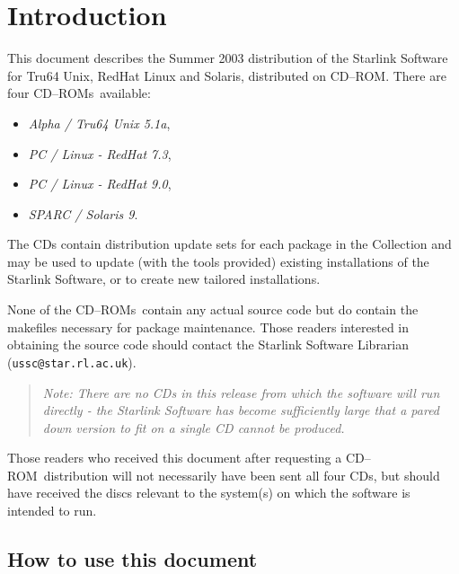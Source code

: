 \documentclass[twoside,11pt]{article}
\newcommand{\htmladdnormallink}[2]{#1}
\newcommand{\xlabel}[1]{}
\renewcommand{\_}{\texttt{\symbol{95}}}
\newcommand{\cdrom}{CD--ROM}
\newcommand{\cdrom}{CD-ROM}
\newcommand{\cdroms}{CD--ROMs}
\newcommand{\cdroms}{CD-ROMs}
\newcommand{\axp}{\textit{Alpha / Tru64 Unix 5.1a}}
\newcommand{\rha}{\textit{PC / Linux - RedHat 7.3}}
\newcommand{\rhb}{\textit{PC / Linux - RedHat 9.0}}
\newcommand{\sol}{\textit{SPARC / Solaris 9}}
\begin{document}
\section{\label{introduction}\xlabel{introduction}Introduction}

This document describes the Summer 2003 distribution of the Starlink
Software for Tru64 Unix, RedHat Linux and Solaris, distributed on
\cdrom.  There are four \cdroms\ available:

\begin{itemize}
\item \axp,
\item \rha,
\item \rhb,
\item \sol.
\end{itemize}

The CDs contain distribution update sets for each package in the
Collection and may be used to update (with the tools provided) existing
installations of the Starlink Software, or to create new tailored
installations.

None of the \cdroms\ contain any actual source code but do contain the
makefiles necessary for package maintenance.  Those readers interested in
obtaining the source code should contact the Starlink Software Librarian
(\htmladdnormallink{\texttt{ussc@star.rl.ac.uk}}{mailto:ussc@star.rl.ac.uk}).

\begin{quote}
\textit{Note: There are no CDs in this release from which the
software will run directly - the Starlink Software has become sufficiently
large that a pared down version to fit on a single CD cannot be produced.}
\end{quote}


Those readers who received this document after requesting a \cdrom\
distribution will not necessarily have been sent all four CDs, but
should have received the discs relevant to the system(s) on which the
software is intended to run.


\subsection{\xlabel{how_to_use_this_document}How to use this document}
\label{how_to_use_this_document}
\end{document}
